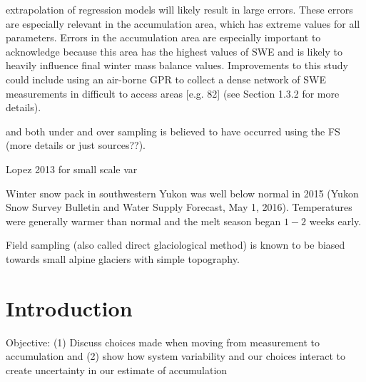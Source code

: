 \documentclass[twocolumn,letterpaper]{igs}
\begin{document}
extrapolation of regression models will
likely result in large errors. These errors are especially relevant in the accumulation area,
which has extreme values for all parameters. Errors in the accumulation area are especially
important to acknowledge because this area has the highest values of SWE and is likely to
heavily influence final winter mass balance values. Improvements to this study could include
using an air-borne GPR to collect a dense network of SWE measurements in difficult to
access areas [e.g. 82] (see Section 1.3.2 for more details).


 and both under and over sampling is believed to have occurred using the FS (more details or just sources??). 


Lopez 2013 for small scale var

Winter snow pack in southwestern Yukon was well below normal in 2015 (Yukon Snow Survey Bulletin and Water Supply Forecast, May 1, 2016). Temperatures were generally warmer than normal and the melt season began $1-2$ weeks early. 

Field sampling (also called direct glaciological method) is known to be biased towards small alpine glaciers with simple topography.

\section{Introduction}

Objective: (1) Discuss choices made when moving from measurement to accumulation and (2) show how system variability and our choices interact to create uncertainty in our estimate of accumulation
\end{document}
